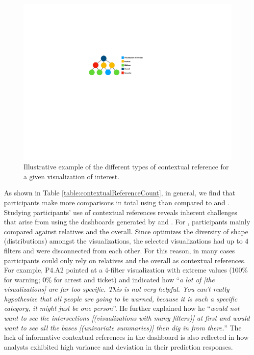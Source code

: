 \begin{figure}[h!]
\centering
\includegraphics[width=\linewidth]{figures/contextual_reference.pdf}
\caption{Illustrative example of the different types of contextual reference for a given visualization of interest.}
\label{fig:reference}
\end{figure}
As shown in Table \ref{table:contextualReferenceCount}, in general, we find that participants make more comparisons in total using \system than compared to \cluster and \BFS. Studying participants' use of contextual references reveals inherent challenges that arise from using the dashboards generated by \BFS and \cluster. For \cluster , participants mainly compared against relatives and the overall. Since \cluster optimizes the diversity of shape (distributions) amongst the visualizations, the selected visualizations had up to 4 filters and were disconnected from each other. For this reason, in many cases participants could only rely on relatives and the overall as contextual references. For example, P4.A2 pointed at a 4-filter visualization with extreme values (100\% for warning; 0\% for arrest and ticket) and indicated how ``\textit{a lot of [the visualizations] are far too specific. This is not very helpful. You can't really hypothesize that all people are going to be warned, because it is such a specific category, it might just be one person}''. %
He further explained how he ``\textit{would not want to see the intersections [(visualizations with many filters)] at first and would want to see all the bases [(univariate summaries)] then dig in from there.}'' The lack of informative contextual references in the \cluster dashboard is also reflected in how analysts exhibited high variance and deviation in their prediction responses.
